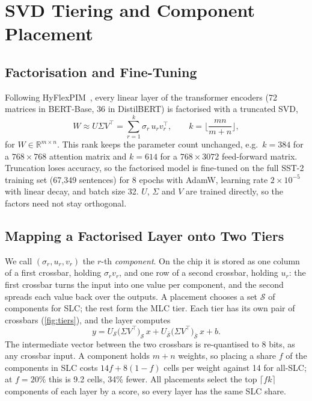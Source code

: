 \section{SVD Tiering and Component Placement}\label{sec:placement}

\subsection{Factorisation and Fine-Tuning}
Following HyFlexPIM~\cite{song2025hyflexpim}, every linear layer of the transformer encoders (72
matrices in BERT-Base, 36 in DistilBERT) is factorised with a truncated SVD,
\begin{equation}
W\approx U\Sigma V^{\top}=\sum_{r=1}^{k}\sigma_r\,u_r v_r^{\top},\qquad
k=\Big\lfloor\frac{mn}{m+n}\Big\rfloor,
\label{eq:svd}
\end{equation}
for $W\in\mathbb R^{m\times n}$. This rank keeps the parameter count unchanged, e.g.\ $k=384$ for a
$768\times768$ attention matrix and $k=614$ for a $768\times3072$ feed-forward matrix. Truncation loses
accuracy, so the factorised model is fine-tuned on the full SST-2 training set (67{,}349 sentences) for 8
epochs with AdamW, learning rate $2\times10^{-5}$ with linear decay, and batch size 32. $U$, $\Sigma$ and
$V$ are trained directly, so the factors need not stay orthogonal.

\subsection{Mapping a Factorised Layer onto Two Tiers}
We call $(\sigma_r,u_r,v_r)$ the $r$-th \emph{component}. On the chip it is stored as one column of a first
crossbar, holding $\sigma_r v_r$, and one row of a second crossbar, holding $u_r$: the first crossbar turns
the input into one value per component, and the second spreads each value back over the outputs. A placement chooses a set
$\mathcal S$ of components for SLC; the rest form the MLC tier. Each tier has its own pair of crossbars
(\cref{fig:tiers}), and the layer computes
\begin{equation}
y=U_{\mathcal S}\big(\Sigma V^{\top}\big)_{\mathcal S}\,x+U_{\bar{\mathcal S}}\big(\Sigma V^{\top}\big)_{\bar{\mathcal S}}\,x+b.
\label{eq:tiers}
\end{equation}
The intermediate vector between the two crossbars is re-quantised to 8 bits, as any crossbar input. A
component holds $m+n$ weights, so placing a share $f$ of the components in SLC costs $14f+8(1-f)$ cells per
weight against 14 for all-SLC; at $f=20\%$ this is 9.2 cells, 34\% fewer. All placements select the top
$\lceil fk\rceil$ components of each layer by a score, so every layer has the same SLC share.

